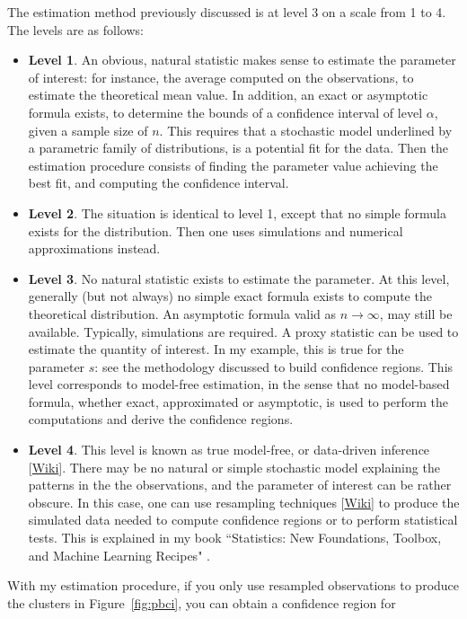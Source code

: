\documentclass[10pt]{article}
\begin{document}
\noindent The estimation method previously discussed is at level 3 on a scale from 1 to 4. The levels are as follows:
\begin{itemize}
\item {\bf Level 1}. An obvious, natural statistic makes sense to estimate the parameter of interest: for instance, the average computed on the observations, to estimate the theoretical mean value.  In addition, an exact or asymptotic formula exists, to determine the bounds of a confidence interval of level $\alpha$, given a sample size of $n$. This requires that a stochastic model underlined by a  parametric family of distributions, is a potential fit for the data. Then the estimation procedure consists of finding the parameter value achieving the best fit, and computing the confidence interval.
\item {\bf Level 2}. The situation is identical to level 1, except that no simple formula exists for the distribution. Then one uses simulations and numerical approximations instead.
\item {\bf Level 3}. No natural statistic exists to estimate the parameter. At this level, generally (but not always) no simple exact formula exists to compute the theoretical distribution. An asymptotic formula valid as $n\rightarrow\infty$, may still be available. Typically, simulations are required. A proxy statistic can be used to estimate the quantity of interest. In my example, this is true for the parameter $s$: see the methodology discussed to build confidence regions. This level corresponds to
model-free estimation, in the sense that no model-based formula, whether exact, approximated or asymptotic, is used to perform the computations and derive the confidence regions.
\item {\bf Level 4}. This level is known as true \textcolor{index}{model-free}, or data-driven inference [\href{https://www.nature.com/articles/s41467-017-02288-4}{Wiki}].  There may be no natural or simple stochastic model explaining the patterns in the the observations, and the parameter of interest can be rather obscure. In this case, one can use \textcolor{index}{resampling} techniques [\href{https://en.wikipedia.org/wiki/Resampling_(statistics)}{Wiki}] to produce the simulated
data needed to compute confidence regions or to perform statistical tests. This is explained in my book ``Statistics: New Foundations, Toolbox, and Machine Learning Recipes" \cite{vgstats}.
\end{itemize}
\noindent With my estimation procedure, if you only use resampled observations to produce the clusters in Figure~\ref{fig:pbci}, you can obtain a confidence region for
\end{document}
